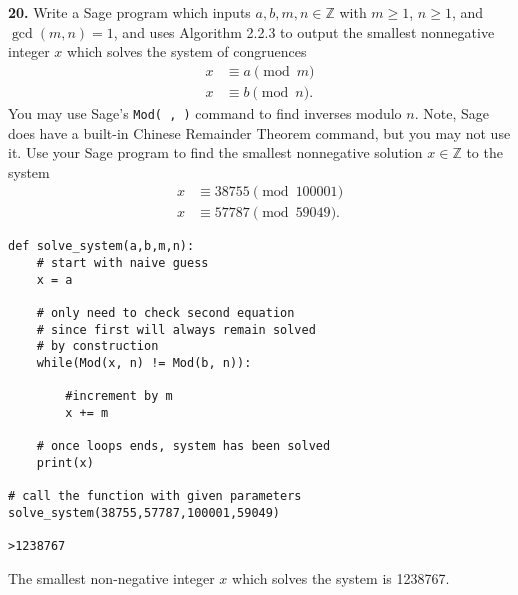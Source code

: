 \documentclass[12pt]{amsart}
\def\ZZ{{\mathbb Z}}
\begin{document}
\newpage



{\bf 20.}  Write a Sage program which inputs $a,b,m,n\in\ZZ$ with $m\geq1$, $n\geq1$, and $\gcd(m,n)=1$, and uses Algorithm 2.2.3 to output the smallest nonnegative integer $x$ which solves the system of congruences
\begin{equation*}
\begin{split}
x & \equiv a \pmod{m} \\
x & \equiv b \pmod{n}.
\end{split}
\end{equation*}
You may use Sage's {\tt Mod( , )} command to find inverses modulo $n$.  Note, Sage does have a built-in Chinese Remainder Theorem command, but you may not use it.  Use your Sage program to find the smallest nonnegative solution $x\in\ZZ$ to the system
\begin{equation*}
\begin{split}
x & \equiv 38755 \pmod{100001} \\
x & \equiv 57787 \pmod{59049}.
\end{split}
\end{equation*}

\medskip

\begin{verbatim}
def solve_system(a,b,m,n):
    # start with naive guess
    x = a
    
    # only need to check second equation
    # since first will always remain solved
    # by construction
    while(Mod(x, n) != Mod(b, n)):
        
        #increment by m
        x += m
    
    # once loops ends, system has been solved
    print(x)

# call the function with given parameters
solve_system(38755,57787,100001,59049)

>1238767
\end{verbatim}

\smallskip

The smallest non-negative integer $x$ which solves the system is 1238767.


\newpage
\end{document}
